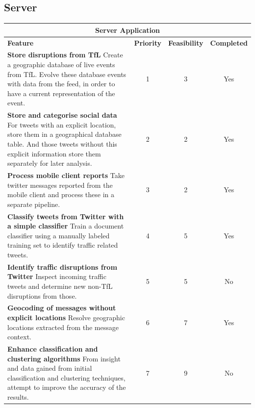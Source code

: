 \subsection{Server}

\begin{center}
\begin{tabular}{ | p{8.5cm} | c | c | c | }
\hline
\multicolumn{4}{|c|}{\textbf{Server Application}} \\ \hline
\textbf{Feature} & \textbf{Priority} & \textbf{Feasibility} & \textbf{Completed}
\\ \hline
\textbf{Store disruptions from TfL} \newline
Create a geographic database of live events from TfL. Evolve these database events with data from the feed, in order to have a current representation of the event. & 1 & 3 & Yes \\ \hline

\textbf{Store and categorise social data} \newline
For tweets with an explicit location, store them in a geographical database
table. And those tweets without this explicit information store them separately for later
analysis. & 2 & 2 & Yes \\ \hline

\textbf{Process mobile client reports} \newline
Take twitter messages reported from the mobile client and process these in a
separate pipeline. & 3 & 2 & Yes \\ \hline

\textbf{Classify tweets from Twitter with a simple classifier} \newline
Train a document classifier using a manually labeled training set to 
identify traffic related tweets. & 4 & 5 & Yes \\ \hline \hline

\textbf{Identify traffic disruptions from Twitter} \newline
Inspect incoming traffic tweets and determine new non-TfL disruptions from
those. & 5 & 5 & No \\ \hline

\textbf{Geocoding of messages without explicit locations} \newline
Resolve geographic locations extracted from the message context. & 6 & 7 & Yes \\ \hline

\textbf{Enhance classification and clustering algorithms} \newline
From insight and data gained from initial classification and clustering
techniques, attempt to improve the accuracy of the results. & 7 & 9 & No \\ \hline


\end{tabular}
\end{center}
